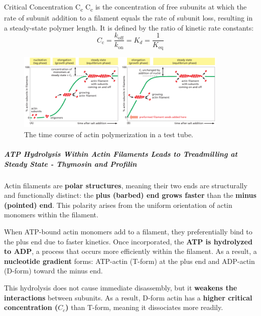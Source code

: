 \documentclass[../main.tex]{subfiles}
\begin{document}
\begin{RemarkWithTitel}{Critical Concentration C\textsubscript{c}}
	C\textsubscript{c} is the concentration of free subunits at which the rate of subunit addition to a filament equals the rate of subunit loss, resulting in a steady-state polymer length. It is defined by the ratio of kinetic rate constants:
	\[
	C_{\text{c}} = \frac{k_{\text{off}}}{k_{\text{on}}} = K_d = \frac{1}{K_{\text{eq}}}
	\]
\end{RemarkWithTitel} 
 
\begin{figure}[H]
	\centering
	\includegraphics[width = 0.9\textwidth]{7}
	\caption{The time course of actin polymerization in a test tube.}
	\label{}
\end{figure}

\subparagraph{ATP Hydrolysis Within Actin Filaments Leads to Treadmilling at Steady State - Thymosin and Profilin}
Actin filaments are \textbf{polar structures}, meaning their two ends are structurally and functionally distinct: the \textbf{plus (barbed) end grows faster} than the \textbf{minus (pointed) end}. This polarity arises from the uniform orientation of actin monomers within the filament.

When ATP-bound actin monomers add to a filament, they preferentially bind to the plus end due to faster kinetics. Once incorporated, the \textbf{ATP is hydrolyzed to ADP}, a process that occurs more efficiently within the filament. As a result, a \textbf{nucleotide gradient} forms: ATP-actin (T-form) at the plus end and ADP-actin (D-form) toward the minus end.

This hydrolysis does not cause immediate disassembly, but it \textbf{weakens the interactions} between subunits. As a result, D-form actin has a \textbf{higher critical concentration ($C_c$)} than T-form, meaning it dissociates more readily.
\end{document}
